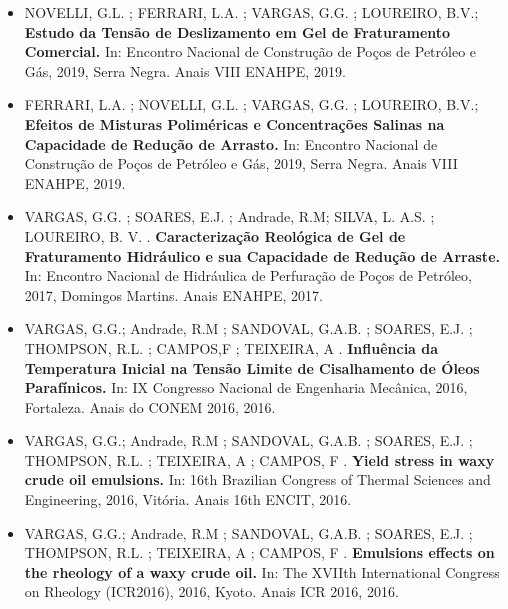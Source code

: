 \documentclass[10pt,a4paper,ragged2e,withhyper]{altacv}
\begin{document}
\begin{paracol}{2}
\begin{itemize}
                \divider
                
                \item NOVELLI, G.L. ; FERRARI, L.A. ; VARGAS, G.G. ; LOUREIRO, B.V.; \textbf{Estudo da Tensão de Deslizamento em Gel de Fraturamento Comercial.} In: Encontro Nacional de Construção de Poços de Petróleo e Gás, 2019, Serra Negra. Anais VIII ENAHPE, 2019.
                
                \divider
                
                \item FERRARI, L.A. ; NOVELLI, G.L. ; VARGAS, G.G. ; LOUREIRO, B.V.; \textbf{Efeitos de Misturas Poliméricas e Concentrações Salinas na Capacidade de Redução de Arrasto.} In: Encontro Nacional de Construção de Poços de Petróleo e Gás, 2019, Serra Negra. Anais VIII ENAHPE, 2019.
                
                \divider
                
                \item VARGAS, G.G. ; SOARES, E.J. ; Andrade, R.M; SILVA, L. A.S. ; LOUREIRO, B. V. . \textbf{Caracterização Reológica de Gel de Fraturamento Hidráulico e sua Capacidade de Redução de Arraste.} In: Encontro Nacional de Hidráulica de Perfuração de Poços de Petróleo, 2017, Domingos Martins. Anais ENAHPE, 2017.
                
                \divider
                
                \item VARGAS, G.G.; Andrade, R.M ; SANDOVAL, G.A.B. ; SOARES, E.J. ; THOMPSON, R.L. ; CAMPOS,F ; TEIXEIRA, A . \textbf{Influência da Temperatura Inicial na Tensão Limite de Cisalhamento de Óleos Parafínicos.} In: IX Congresso Nacional de Engenharia Mecânica, 2016, Fortaleza. Anais do CONEM 2016, 2016.
                
                \divider
                
                \item VARGAS, G.G.; Andrade, R.M ; SANDOVAL, G.A.B. ; SOARES, E.J. ; THOMPSON, R.L. ; TEIXEIRA, A ; CAMPOS, F . \textbf{Yield stress in waxy crude oil emulsions.} In: 16th Brazilian Congress of Thermal Sciences and Engineering, 2016, Vitória. Anais 16th ENCIT, 2016. 
                
                \divider
                
                \item VARGAS, G.G.; Andrade, R.M ; SANDOVAL, G.A.B. ; SOARES, E.J. ; THOMPSON, R.L. ; TEIXEIRA, A ; CAMPOS, F . \textbf{Emulsions effects on the rheology of a waxy crude oil.} In: The XVIIth International Congress on Rheology (ICR2016), 2016, Kyoto. Anais ICR 2016, 2016.
            \end{itemize}

            

    \end{paracol}
\end{document}
